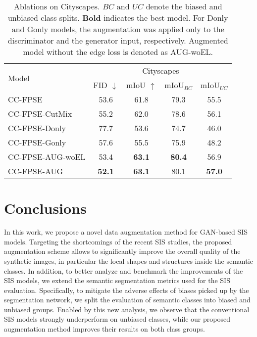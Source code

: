 \documentclass[final]{cvpr}
\newcommand\+{\mkern4mu}
\begin{document}
\begin{table}[t]
	
	\setlength{\tabcolsep}{0.07em}
	\renewcommand{\arraystretch}{1.0}
	
\centering
\begin{tabular}{@{}l@{\hspace{0.2cm}}cccc@{}}


\multirow{2}{*}{ Model } & \multicolumn{4}{c}{ Cityscapes} \tabularnewline  
			
		&	 FID $\downarrow$&  mIoU $\uparrow$&  mIoU$_{BC}$&  mIoU$_{UC}$
			\tabularnewline  


		  \cmidrule(lr){2-5}  	
			
		  CC-FPSE & 53.6 & 61.8 & 79.3 & 55.5 \tabularnewline [0.1cm]
		  
		  CC-FPSE-CutMix & 55.2 & 62.0 & 78.6 & 56.1 \tabularnewline [0.1cm]  	 
		  
		  CC-FPSE-Donly & 77.7 & 53.6 & 74.7 & 46.0 \tabularnewline
		  
		  CC-FPSE-Gonly & 57.6 & 55.5 & 75.9 & 48.2 \tabularnewline [0.1cm]  
		  
		  CC-FPSE-AUG-woEL & 53.4 & \textbf{63.1} & \textbf{80.4} & 56.9 \tabularnewline [0.1cm]  
		  
		  CC-FPSE-AUG &  \textbf{52.1}&  \textbf{63.1} & 80.1 & \textbf{57.0} \tabularnewline
		 
		\end{tabular}\vspace{0.5em}
	\caption{Ablations on Cityscapes. ${BC}$ and ${UC}$ denote the biased and unbiased class splits. \textbf{Bold} indicates the best model. For Donly and Gonly models, the augmentation was applied only to the discriminator and the generator input, respectively.  Augmented model without the edge loss is denoted as AUG-woEL.}
	\label{tab:ablations}
\vspace{-1.5em}
\end{table}   	
	\section{Conclusions}
\label{sec:conclusions}

In this work, we propose a novel data augmentation method for GAN-based SIS models. Targeting the shortcomings of the recent SIS studies, the proposed augmentation scheme allows to significantly improve the overall quality of the synthetic images, in particular the local shapes and structures inside the semantic classes. In addition, to better analyze and benchmark the improvements of the SIS models, we extend the semantic segmentation metrics used for the SIS evaluation. Specifically, to mitigate the adverse effects of biases picked up by the segmentation network, we split the evaluation of semantic classes into biased and unbiased groups. Enabled by this new analysis, we observe that the conventional SIS models strongly underperform on unbiased classes, while our proposed augmentation method improves their results on both class groups. 	
	{\small
		
		
	}
	
\end{document}
